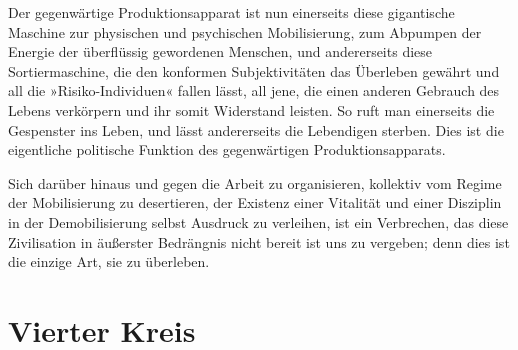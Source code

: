 Der gegenwärtige Produktionsapparat ist nun einerseits diese
gigantische Maschine zur physischen und psychischen Mobilisierung,
zum Abpumpen der Energie der überflüssig gewordenen Menschen, und
andererseits diese Sortiermaschine, die den konformen
Subjektivitäten das Überleben gewährt und all die
»Risiko-Individuen« fallen lässt, all jene, die einen anderen
Gebrauch des Lebens verkörpern und ihr somit Widerstand leisten. So
ruft man einerseits die Gespenster ins Leben, und lässt
andererseits die Lebendigen sterben. Dies ist die eigentliche
politische Funktion des gegenwärtigen Produktionsapparats.

\extrapar{}

Sich darüber hinaus und gegen die Arbeit zu organisieren, kollektiv
vom Regime der Mobilisierung zu desertieren, der Existenz einer
Vitalität und einer Disziplin in der Demobilisierung selbst
Ausdruck zu verleihen, ist ein Verbrechen, das diese Zivilisation
in äußerster Bedrängnis nicht bereit ist uns zu vergeben; denn dies
ist die einzige Art, sie zu überleben.

\section{Vierter Kreis}


